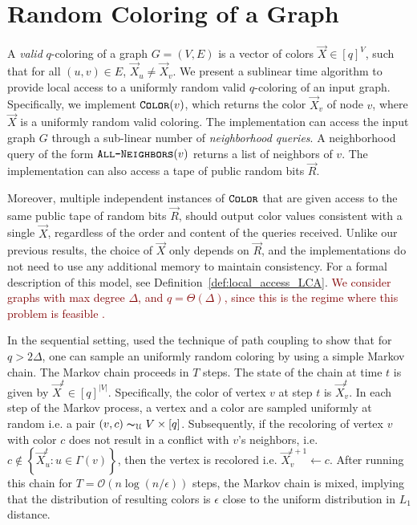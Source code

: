 \section{Random Coloring of a Graph}%
\label{sec:random_coloring_of_a_graph}
A \emph{valid} $q$-coloring of a graph $G=(V, E)$ is a vector of colors $\vec X \in [q]^V$, such that for all $(u,v)\in E$, $\vec X_u \not= \vec X_v$.
We present a sublinear time algorithm to provide local access to a uniformly random valid $q$-coloring of an input graph.
Specifically, we implement $\texttt{\textsc{Color}}(v)$, which returns the color $\vec X_v$ of node $v$, where $\vec X$ is a uniformly random valid coloring.
The implementation can access the input graph $G$ through a sub-linear number of \emph{neighborhood queries}.
A neighborhood query of the form $\texttt{\textsc{All-Neighbors}}(v)$ returns a list of neighbors of $v$.
The implementation can also access a tape of public random bits $\vec R$.

Moreover, multiple independent instances of $\texttt{\textsc{Color}}$ that are given access to the same public tape of random bits $\vec R$,
should output color values consistent with a single $\vec X$, regardless of the order and content of the queries received.
Unlike our previous results, the choice of $\vec X$ only depends on $\vec R$,
and the  implementations do not need to use any additional memory to maintain consistency.
For a formal description of this model, see Definition~\ref{def:local_access_LCA}.
\textcolor{Maroon}{We consider graphs with max degree $\Delta$, and $q = \Theta(\Delta)$, since this is the regime where this problem is feasible \cite{glauber_survey}.}

In the sequential setting, \cite{glauber_survey} used the technique of path coupling to show that for $q > 2\Delta$,
one can sample an uniformly random coloring by using a simple Markov chain.
The Markov chain proceeds in $T$ steps. The state of the chain at time $t$ is given by $\vec X^t\in [q]^{|V|}$.
Specifically, the color of vertex $v$ at step $t$ is $\vec X^t_v$.
In each step of the Markov process, a vertex and a color are sampled uniformly at random i.e. a pair $(v, c)\thicksim_{\mathcal U} V\times [q]$.
Subsequently, if the recoloring of vertex $v$ with color $c$ does not result in a conflict with $v$'s neighbors,
i.e. $c\not\in \left\{ \vec X^t_u : u\in \Gamma(v)\right\}$, then the vertex is recolored i.e. $\vec X_v^{t+1}\leftarrow c$.
After running this chain for $T = \mathcal{O}(n\log (n/\epsilon))$ steps, the Markov chain is mixed,
implying that the distribution of resulting colors is $\epsilon$ close to the uniform distribution in $L_1$ distance.



